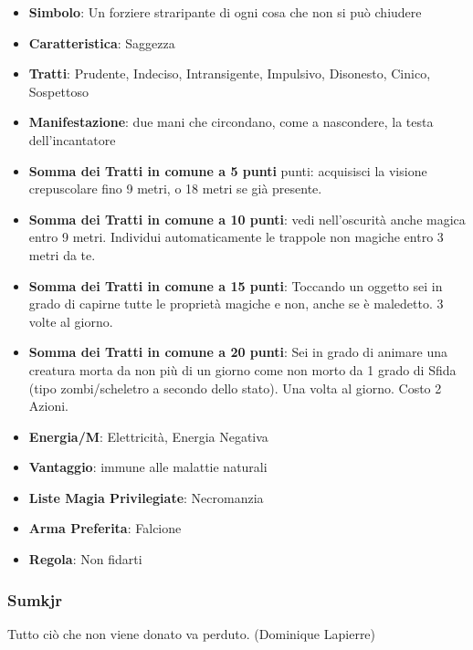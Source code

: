 \begin{multicols}{2}
\begin{itemize}[leftmargin=*] \setlength{\itemsep}{0pt}
\item \textbf{Simbolo}: Un forziere straripante di ogni cosa che non si può chiudere
\item \textbf{Caratteristica}: Saggezza
\item \textbf{Tratti}: Prudente, Indeciso, Intransigente, Impulsivo, Disonesto, Cinico, Sospettoso
\item \textbf{Manifestazione}: due mani che circondano, come a nascondere, la testa dell'incantatore
\item \textbf{Somma dei Tratti in comune a 5 punti} punti: acquisisci la visione crepuscolare fino 9 metri, o 18 metri se già presente.
\item \textbf{Somma dei Tratti in comune a 10 punti}: vedi nell'oscurità anche magica entro 9 metri. Individui automaticamente le trappole non magiche entro 3 metri da te.
\item \textbf{Somma dei Tratti in comune a 15 punti}: Toccando un oggetto sei in grado di capirne tutte le proprietà magiche e non, anche se è maledetto. 3 volte al giorno.
\item \textbf{Somma dei Tratti in comune a 20 punti}: Sei in grado di animare una creatura morta da non più di un giorno come non morto da 1 grado di Sfida (tipo zombi/scheletro a secondo dello stato). Una volta al giorno. Costo 2 Azioni.
\item \textbf{Energia/M}: Elettricità, Energia Negativa
\item \textbf{Vantaggio}: immune alle malattie naturali
\item \textbf{Liste Magia Privilegiate}: Necromanzia
\item \textbf{Arma Preferita}: Falcione
\item \textbf{Regola}: Non fidarti
\end{itemize}

\subsubsection{Sumkjr}\label{sumkjr}\hypertarget{sumkjr}{}

\begin{changemargin}{0.3cm}{0.3cm}\begin{enfasi}{
Tutto ciò che non viene donato va perduto. (Dominique Lapierre)
}\end{enfasi}\end{changemargin}\medskip


\end{multicols}
